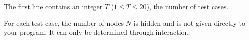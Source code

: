 The first line contains an integer $T$ ($1 \le T \le 20$), the number of test cases.

For each test case, the number of nodes $N$ is hidden and is not given directly to your program. It can only be determined through interaction.